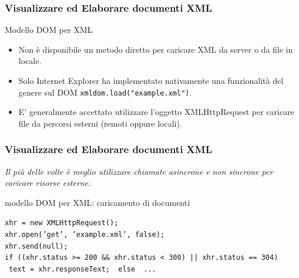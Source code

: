 \begin{frame}
    \frametitle{Visualizzare ed Elaborare documenti XML}
    \addtocounter{nframe}{1}
    

     \begin{block}{Modello DOM per XML}
        \begin{itemize}
            \item Non è disponibile un metodo diretto per caricare XML da server o da file in locale. 
            \item Solo Internet Explorer ha implementato nativamente una funzionalità del genere sul DOM \texttt{xmldom.load("example.xml")}.
            \item E' generalmente accettato utilizzare l'oggetto XMLHttpRequest per caricare file da percorsi esterni (remoti oppure locali).
        \end{itemize}
        
     \end{block}

     
\end{frame}

\begin{frame}
    \frametitle{Visualizzare ed Elaborare documenti XML}
    \addtocounter{nframe}{1}
    

    \textit{Il più delle volte è meglio utilizzare chiamate asincrone e non sincrone per caricare risorse esterne.}

     \begin{block}{modello DOM per XML: caricamento di documenti}
       
        \texttt{xhr = new XMLHttpRequest();}
        \\\texttt{xhr.open('get', 'example.xml', false);} 
        \\\texttt{xhr.send(null);}
        \\\texttt{if ((xhr.status >= 200 \&\& xhr.status < 300) || xhr.status == 304)}
        \\\texttt{{ text = xhr.responseText; } else { ... }}
        
     \end{block}
     
\end{frame}
     

